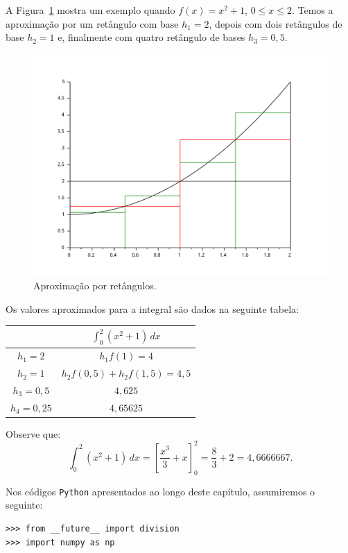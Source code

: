 \begin{ex}
A Figura~\ref{fig:int_101} mostra um exemplo quando $f(x)=x^2+1$, $0\leq x\leq 2$. Temos a aproximação por um retângulo com base $h_1=2$, depois com dois retângulos de base $h_2=1$ e, finalmente com quatro retângulo de bases $h_3=0,5$.
\begin{figure}
  \centering
  \includegraphics[scale=0.7]{./cap_integracao/pics/int_1/int_1}
  \caption{Aproximação por retângulos.}
  \label{fig:int_101}
\end{figure}

Os valores aproximados para a integral são dados na seguinte tabela:
\begin{center}
  \begin{tabular}{|c|c|}\hline
    & $\displaystyle \int_0^2(x^2+1)\,dx$ \\ \hline
    $h_1=2$ & $h_1f(1)=4$ \\
    $h_2=1$ & $h_2f(0,5)+h_2f(1,5)=4,5$ \\
    $h_3=0,5$ & $4,625$ \\
    $h_4=0,25$ & $4,65625$ \\\hline
  \end{tabular}
\end{center}
Observe que:
\begin{equation*}
  \int_0^2(x^2+1)\,dx = \left[\frac{x^3}{3}+x\right]_0^2 = \frac{8}{3}+2=4,6666667.
\end{equation*}
\end{ex}

\ifispython
Nos códigos \verb+Python+ apresentados ao longo deste capítulo, assumiremos o seguinte:
\begin{verbatim}
>>> from __future__ import division
>>> import numpy as np
\end{verbatim}
\fi

